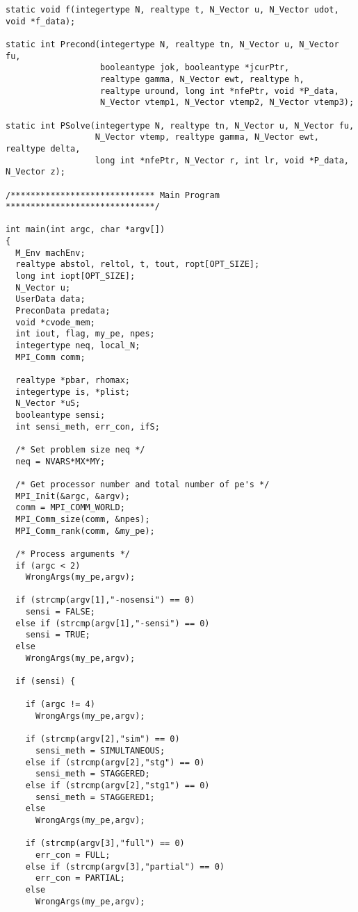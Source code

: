 \begin{verbatim}
static void f(integertype N, realtype t, N_Vector u, N_Vector udot, void *f_data);

static int Precond(integertype N, realtype tn, N_Vector u, N_Vector fu, 
                   booleantype jok, booleantype *jcurPtr, 
                   realtype gamma, N_Vector ewt, realtype h,
                   realtype uround, long int *nfePtr, void *P_data,
                   N_Vector vtemp1, N_Vector vtemp2, N_Vector vtemp3);

static int PSolve(integertype N, realtype tn, N_Vector u, N_Vector fu, 
                  N_Vector vtemp, realtype gamma, N_Vector ewt, realtype delta, 
                  long int *nfePtr, N_Vector r, int lr, void *P_data, N_Vector z);

/***************************** Main Program ******************************/

int main(int argc, char *argv[])
{
  M_Env machEnv;
  realtype abstol, reltol, t, tout, ropt[OPT_SIZE];
  long int iopt[OPT_SIZE];
  N_Vector u;
  UserData data;
  PreconData predata;
  void *cvode_mem;
  int iout, flag, my_pe, npes;
  integertype neq, local_N;
  MPI_Comm comm;

  realtype *pbar, rhomax;
  integertype is, *plist;
  N_Vector *uS;
  booleantype sensi;
  int sensi_meth, err_con, ifS;

  /* Set problem size neq */
  neq = NVARS*MX*MY;

  /* Get processor number and total number of pe's */
  MPI_Init(&argc, &argv);
  comm = MPI_COMM_WORLD;
  MPI_Comm_size(comm, &npes);
  MPI_Comm_rank(comm, &my_pe);

  /* Process arguments */
  if (argc < 2)
    WrongArgs(my_pe,argv);

  if (strcmp(argv[1],"-nosensi") == 0)
    sensi = FALSE;
  else if (strcmp(argv[1],"-sensi") == 0)
    sensi = TRUE;
  else
    WrongArgs(my_pe,argv);

  if (sensi) {

    if (argc != 4)
      WrongArgs(my_pe,argv);

    if (strcmp(argv[2],"sim") == 0)
      sensi_meth = SIMULTANEOUS;
    else if (strcmp(argv[2],"stg") == 0)
      sensi_meth = STAGGERED;
    else if (strcmp(argv[2],"stg1") == 0)
      sensi_meth = STAGGERED1;
    else 
      WrongArgs(my_pe,argv);

    if (strcmp(argv[3],"full") == 0)
      err_con = FULL;
    else if (strcmp(argv[3],"partial") == 0)
      err_con = PARTIAL;
    else
      WrongArgs(my_pe,argv);


\end{verbatim}

